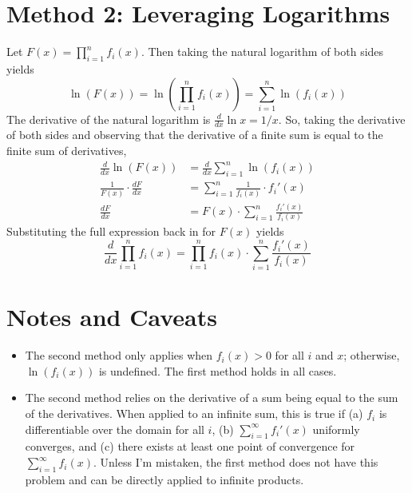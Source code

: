 \documentclass[10pt]{article}
\begin{document}
\section*{Method 2: Leveraging Logarithms}

Let $F(x) = \prod_{i=1}^n f_i(x)$.
Then taking the natural logarithm of both sides yields
\[\ln(F(x)) = \ln\left(\prod_{i=1}^n f_i(x)\right) = \sum_{i=1}^n \ln(f_i(x))\]
The derivative of the natural logarithm is $\frac{d}{dx}\ln x = 1/x$.
So, taking the derivative of both sides and observing that the derivative of a finite sum is equal to the finite sum of derivatives,
\begin{align*}
    \frac{d}{dx}\ln(F(x)) &= \frac{d}{dx}\sum_{i=1}^n \ln(f_i(x)) \\
    \frac{1}{F(x)} \cdot \frac{dF}{dx} &= \sum_{i=1}^n \frac{1}{f_i(x)} \cdot f_i'(x) \\
    \frac{dF}{dx} &= F(x) \cdot \sum_{i=1}^n \frac{f_i'(x)}{f_i(x)}
\end{align*}
Substituting the full expression back in for $F(x)$ yields
\[\frac{d}{dx}\prod_{i=1}^n f_i(x) = \prod_{i=1}^n f_i(x) \cdot \sum_{i=1}^n \frac{f_i'(x)}{f_i(x)}\]




\section*{Notes and Caveats}

\begin{itemize}
    \item The second method only applies when $f_i(x) > 0$ for all $i$ and $x$; otherwise, $\ln(f_i(x))$ is undefined.
    The first method holds in all cases.

    \item The second method relies on the derivative of a sum being equal to the sum of the derivatives.
    When applied to an infinite sum, this is true if (a) $f_i$ is differentiable over the domain for all $i$, (b) $\sum_{i=1}^\infty f_i'(x)$ uniformly converges, and (c) there exists at least one point of convergence for $\sum_{i=1}^\infty f_i(x)$.
    Unless I'm mistaken, the first method does not have this problem and can be directly applied to infinite products.
\end{itemize}
\end{document}
